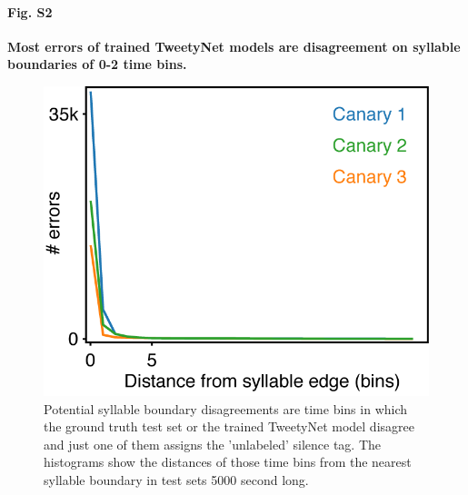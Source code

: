 \documentclass[10pt,letterpaper]{article}
\begin{document}
\paragraph*{Fig. S2}
\label{S2_Fig}
{\bf Most errors of trained TweetyNet models are disagreement on syllable boundaries of 0-2 time bins.}
\begin{figure}[!ht]
\includegraphics[scale=1.0]{Figures/Supplementaries/EdgeErrorDistCanaries.png}
\caption{Potential syllable boundary disagreements are time bins in which the ground truth test set or the trained TweetyNet model disagree and just one of them assigns the 'unlabeled' silence tag. The histograms show the distances of those time bins from the nearest syllable boundary in test sets 5000 second long.}
\label{supp_fig_2}
\end{figure}



\nolinenumbers

%
%
% 






\end{document}
